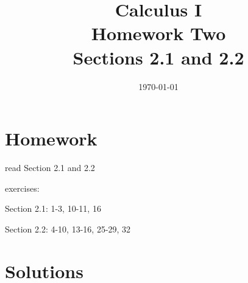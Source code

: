 \documentclass[letterpaper]{exam}
\title{Calculus I \\ Homework Two \\ Sections 2.1 and 2.2}
\author{}
\date{\today}
\begin{document}
  \maketitle

  \section{Homework}
    \begin{itemize*}
      \item read Section 2.1 and 2.2
      \item exercises: 
        \begin{itemize*}
          \item Section 2.1: 1-3, 10-11, 16
          \item Section 2.2: 4-10, 13-16, 25-29, 32
        \end{itemize*}
    \end{itemize*}

  \ifprintanswers

    \section{Solutions}
\end{document}
